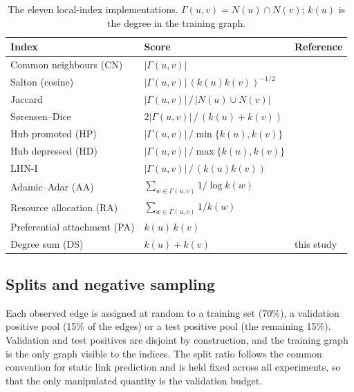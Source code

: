 \documentclass{comjnl}
\begin{document}
\begin{table}[htbp]
\centering
\footnotesize
\caption{The eleven local-index implementations. $\Gamma(u,v)=N(u)\cap N(v)$; $k(u)$ is the degree in the training graph.}
\label{tab:indices}
\begin{tabular}{lll}
\toprule
Index & Score & Reference \\
\midrule
Common neighbours (CN) & $|\Gamma(u,v)|$ & \citet{libennowell2007link} \\
Salton (cosine) & $|\Gamma(u,v)|\,(k(u)k(v))^{-1/2}$ & \citet{salton1983introduction} \\
Jaccard & $|\Gamma(u,v)|\,/\,|N(u)\cup N(v)|$ & \citet{jaccard1912distribution} \\
S{\o}rensen--Dice & $2|\Gamma(u,v)|\,/\,(k(u)+k(v))$ & \citet{sorensen1948method} \\
Hub promoted (HP) & $|\Gamma(u,v)|\,/\min\{k(u),k(v)\}$ & \citet{ravasz2002hierarchical} \\
Hub depressed (HD) & $|\Gamma(u,v)|\,/\max\{k(u),k(v)\}$ & \citet{ravasz2002hierarchical} \\
LHN-I & $|\Gamma(u,v)|\,/\,(k(u)k(v))$ & \citet{leicht2006vertex} \\
Adamic--Adar (AA) & $\sum_{w\in\Gamma(u,v)}1/\log k(w)$ & \citet{adamic2003friends} \\
Resource allocation (RA) & $\sum_{w\in\Gamma(u,v)}1/k(w)$ & \citet{zhou2009predicting} \\
Preferential attachment (PA) & $k(u)\,k(v)$ & \citet{barabasi1999emergence} \\
Degree sum (DS) & $k(u)+k(v)$ & this study \\
\bottomrule
\end{tabular}
\end{table}

\subsection{Splits and negative sampling}
\label{sec:negative}

Each observed edge is assigned at random to a training set (70\%), a validation positive pool (15\% of the edges) or a test positive pool (the remaining 15\%). Validation and test positives are disjoint by construction, and the training graph is the only graph visible to the indices. The split ratio follows the common convention for static link prediction and is held fixed across all experiments, so that the only manipulated quantity is the validation budget.
\end{document}

